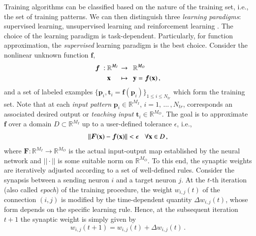 \documentclass{elsarticle}
\numberwithin{equation}{section}
\theoremstyle{theorem}
\theoremstyle{definition}
\theoremstyle{remark}
\theoremstyle{proposition}
\numberwithin{figure}{section}
\newcommand{\bg}[1]{\boldsymbol{#1}}
\begin{document}
		Training algorithms can be classified based on the nature of the training set, i.e., the set of training patterns. We can then distinguish three \emph{learning paradigms}: supervised learning, unsupervised learning and reinforcement learning \cite{Hag14}. The choice of the learning paradigm is task-dependent. Particularly, for function approximation, the \emph{supervised} learning paradigm is the best choice. Consider the nonlinear unknown function $\bg{f}$,
		\begin{equation*}
			\begin{aligned}
				\bg{f} ~ : ~ & \mathbb{R}^{M_I} \hspace*{-0.3cm} && \rightarrow ~~ \mathbb{R}^{M_O} \\
						     & \mathbf{x} && \mapsto ~~ \mathbf{y} = \bg{f}(\mathbf{x}) \, ,
			\end{aligned}
		\end{equation*}
		and a set of labeled examples $\big\lbrace \mathbf{p}_i, \mathbf{t}_i = \bg{f}(\mathbf{p}_i)\big\rbrace_{1 \leq i \leq N_{tr}}$ which form the training set. Note that at each \emph{input pattern} $\mathbf{p}_i \in \mathbb{R}^{M_I}$, $i = 1, \, \ldots \, , N_{tr}$, corresponds an associated desired output or \emph{teaching input} $\mathbf{t}_i \in \mathbb{R}^{M_O}$. The goal is to approximate $\bg{f}$ over a domain $D \subset \mathbb{R}^{M_I}$ up to a user-defined tolerance $\epsilon$, i.e.,
		\begin{equation*}
			||\bg{F}(\mathbf{x}) - \boldsymbol{f}(\mathbf{x})|| < \epsilon \hspace*{0.3cm} \text{$\forall \mathbf{x} \in D$} \, ,
		\end{equation*}
		where $\bg{F} : \mathbb{R}^{M_I} \rightarrow \mathbb{R}^{M_O}$ is the actual input-output map established by the neural network and $||\cdot||$ is some suitable norm on $\mathbb{R}^{M_O}$. To this end, the synaptic weights are iteratively adjusted according to a set of well-defined rules. Consider the synapsis between a sending neuron $i$ and a target neuron $j$. At the $t$-th iteration (also called \emph{epoch}) of the training procedure, the weight $w_{i,j}(t)$ of the connection $(i,j)$ is modified by the time-dependent quantity $\Delta w_{i,j}(t)$, whose form depends on the specific learning rule. Hence, at the subsequent iteration $t+1$ the synaptic weight is simply given by
		\begin{equation*}
			\label{eq:weight-update}
			w_{i,j}(t+1) = w_{i,j}(t) + \Delta w_{i,j}(t) \, .
		\end{equation*}
\end{document}
